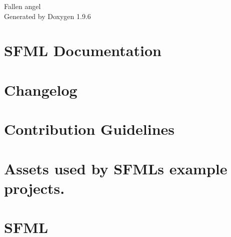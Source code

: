 \documentclass[twoside]{book}
\newcommand{\+}{\discretionary{\mbox{\scriptsize$\hookleftarrow$}}{}{}}
\newcommand{\clearemptydoublepage}{%
    \newpage{\pagestyle{empty}\cleardoublepage}%
  }
\begin{document}
  \raggedbottom
    \hypersetup{pageanchor=false,
                bookmarksnumbered=true,
                pdfencoding=unicode
               }
  \begin{titlepage}
  \vspace*{7cm}
  \begin{center}%
  {\Large Fallen angel}\\
  \vspace*{1cm}
  {\large Generated by Doxygen 1.9.6}\\
  \end{center}
  \end{titlepage}
  \clearemptydoublepage
  \tableofcontents
  \clearemptydoublepage
  \hypersetup{pageanchor=true}
\chapter{SFML Documentation}
\label{index}\hypertarget{index}{}
\chapter{Changelog}
\label{md_cmake_build_debug__deps_sfml_src_changelog}

\chapter{Contribution Guidelines}
\label{md_cmake_build_debug__deps_sfml_src_CONTRIBUTING}

\chapter{Assets used by SFML\textquotesingle{}s example projects.}
\label{md_cmake_build_debug__deps_sfml_src_examples_asset_licenses}

\chapter{SFML}
\label{md_cmake_build_debug__deps_sfml_src_license}

\end{document}
